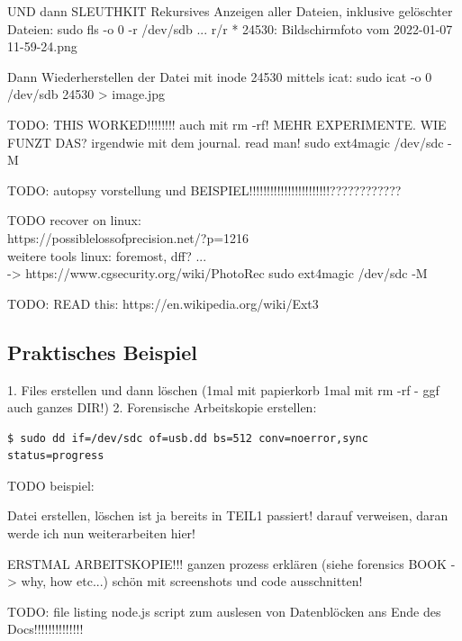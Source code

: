 UND dann SLEUTHKIT
Rekursives Anzeigen aller Dateien, inklusive gelöschter Dateien:
sudo fls -o 0 -r /dev/sdb
...
r/r * 24530:	Bildschirmfoto vom 2022-01-07 11-59-24.png

Dann Wiederherstellen der Datei mit inode 24530 mittels icat:
sudo icat -o 0 /dev/sdb 24530 > image.jpg


TODO: THIS WORKED!!!!!!!! auch mit rm -rf! MEHR EXPERIMENTE. WIE FUNZT DAS?
irgendwie mit dem journal. read man!
sudo ext4magic /dev/sdc -M




TODO: autopsy vorstellung und BEISPIEL!!!!!!!!!!!!!!!!!!!!!!!????????????

TODO recover on linux:\\
	https://possiblelossofprecision.net/?p=1216\\
	weitere tools linux: foremost, dff? ...\\
		-> https://www.cgsecurity.org/wiki/PhotoRec
	sudo ext4magic /dev/sdc -M

TODO:
READ this: https://en.wikipedia.org/wiki/Ext3




\subsection{Praktisches Beispiel}

1. Files erstellen und dann löschen (1mal mit papierkorb 1mal mit rm -rf - ggf auch ganzes DIR!)
2. Forensische Arbeitskopie erstellen:

\begin{lstlisting}
$ sudo dd if=/dev/sdc of=usb.dd bs=512 conv=noerror,sync status=progress
\end{lstlisting}

TODO beispiel:

Datei erstellen, löschen ist ja bereits in TEIL1 passiert! darauf verweisen, daran werde ich nun weiterarbeiten hier!

ERSTMAL ARBEITSKOPIE!!! ganzen prozess erklären (siehe forensics BOOK -> why, how etc...)
schön mit screenshots und code ausschnitten!

TODO: file listing node.js script zum auslesen von Datenblöcken ans Ende des Docs!!!!!!!!!!!!!!